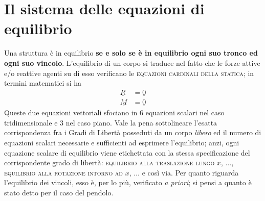 \section{Il sistema delle equazioni di equilibrio}
Una struttura è in equilibrio \textbf{se e solo se è in equilibrio ogni suo tronco ed ogni suo vincolo}. L'equilibrio di un corpo si traduce nel fatto che le forze attive e/o reattive agenti su di esso verificano le \textsc{equazioni cardinali della statica}; in termini matematici si ha
\begin{align*}
\underline{R} &= \underline{0} \\
\underline{M} &= \underline{0}
\end{align*}
Queste due equazioni vettoriali sfociano in $6$ equazioni scalari nel caso tridimensionale e $3$ nel caso piano. Vale la pena sottolineare l'esatta corrispondenza fra i Gradi di Libertà posseduti da un corpo \emph{libero} ed il numero di equazioni scalari necessarie e sufficienti ad esprimere l'equilibrio; anzi, ogni equazione scalare di equilibrio viene etichettata con la stessa specificazione del corrispondente grado di libertà: \textsc{equilibrio alla traslazione lungo} $x$, $\dots$, \textsc{equilibrio alla rotazione intorno ad} $x$, $\dots$ e così via. Per quanto riguarda l'equilibrio dei vincoli, esso è, per lo più, verificato \emph{a priori}; si pensi a quanto è stato detto per il caso del pendolo. 

